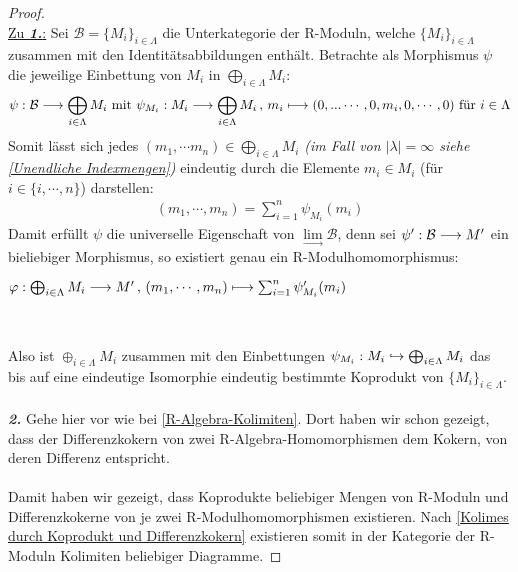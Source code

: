 \documentclass[10pt,a4paper]{report}
\newcommand{\comment}[1]{}
\newcommand{\functionfront}[3]{\nolinebreak{#1:#2 \longrightarrow #3}}
\newcommand{\function}[5]{\nolinebreak{#1:#2 \longrightarrow #3 \, , \, #4 \longmapsto #5}}
\newcommand{\infunctionfront}[3]{\nolinebreak{#1:#2 \hookrightarrow #3}}
\newcommand{\colimes}[0]{\lim\limits_{ \longrightarrow }}
\begin{document}
\begin{proof} \ \\
\underline{Zu \textit{\textbf{1.}}:}
Sei $\mathcal{B} = \lbrace M_i \rbrace_{i \in \Lambda}$ die Unterkategorie der R-Moduln, welche $\lbrace M_i \rbrace_{i \in \Lambda}$ zusammen mit den Identitätsabbildungen enthält. Betrachte als Morphismus $\psi$ die jeweilige Einbettung von $M_i$ in $\bigoplus_{i \in \Lambda} M_i$:
\begin{gather*}
\functionfront{\psi}{\mathcal{B}}{\bigoplus_{i \in \Lambda} M_i} \text{ mit } \function{\psi_{M_i}}{M_i}{\bigoplus_{i \in \Lambda} M_i}{m_i}{(0, ...\cdots ,0,m_i,0, \cdots ,0)} \text{ für } i \in \Lambda
\end{gather*}
Somit lässt sich jedes $(m_1, \cdots m_n) \in \bigoplus_{i \in \Lambda} M_i$ \textit{(im Fall von $\vert \lambda \vert = \infty$ siehe \cref{Unendliche Indexmengen})} eindeutig durch die Elemente $m_i \in M_i$ (für $i \in \lbrace i , \cdots , n \rbrace$) darstellen:
\begin{gather*}
(m_1, \cdots ,m_n) = \sum_{i = 1}^n \psi_{M_i}(m_i)
\end{gather*}
Damit erfüllt $\psi$ die universelle Eigenschaft von $\colimes \mathcal{B}$, denn sei $\functionfront{\psi'}{\mathcal{B}}{M'}$ ein bieliebiger Morphismus, so existiert genau ein R-Modulhomomorphismus:
\begin{center}
$\function{\varphi}{\bigoplus_{i \in \Lambda} M_i }{M'}{(m_1, \cdots , m_n)}{\sum_{i = 1}^n \psi'_{M_i}(m_i)}$
\\
\end{center}
\comment{
Für ein beliebiges $i$ existiert genau ein $\function{\varphi_i}{M_i \oplus 0}{M'}{(0,...,0,m_i,0,...,0}{\psi_i '(m_i)}$ mit $\psi_i ' = \psi_i \circ \varphi_i$\\
$\Rightarrow  \exists ! \function{\varphi}{\bigoplus_i M_i}{M'}{(m_1,...,m_n)}{\sum_i \psi_i(m_i)}$\\
}
Also ist $\oplus_{i \in \Lambda} M_i$ zusammen mit den Einbettungen $\infunctionfront{\psi_{M_i}}{M_i}{\bigoplus_{i \in \Lambda} M_i}$ das bis auf eine eindeutige Isomorphie eindeutig bestimmte Koprodukt von $\lbrace M_i \rbrace_{i \in \Lambda}$.
\ \\
\textit{\textbf{2.}} Gehe hier vor wie bei \cref{R-Algebra-Kolimiten}. Dort haben wir schon gezeigt, dass der Differenzkokern von zwei R-Algebra-Homomorphismen dem Kokern, von deren Differenz entspricht.\\
\ \\
Damit haben wir gezeigt, dass Koprodukte beliebiger Mengen von R-Moduln und Differenzkokerne von je zwei R-Modulhomomorphismen existieren. Nach \cref{Kolimes durch Koprodukt und Differenzkokern} existieren somit in der Kategorie der R-Moduln Kolimiten beliebiger Diagramme.
\end{proof}
\end{document}

